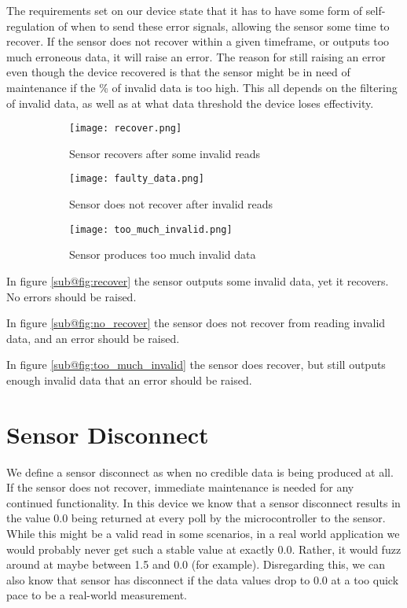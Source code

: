 The requirements set on our device state that it has to have some form of self-regulation of when to send these error signals, allowing the sensor some time to recover. If the sensor does not recover within a given timeframe, or outputs too much erroneous data, it will raise an error. The reason for still raising an error even though the device recovered is that the sensor might be in need of maintenance if the \% of invalid data is too high. This all depends on the filtering of invalid data, as well as at what data threshold the device loses effectivity.

\begin{figure}[H]
\centering
	\begin{subfigure}[b]{0.3\textwidth}
    \texttt{[image: recover.png]}
    \caption{Sensor recovers after some invalid reads}
    \label{fig:recover}
	\end{subfigure}
	\begin{subfigure}[b]{0.3\textwidth}
    \texttt{[image: faulty\_data.png]}
    \caption{Sensor does not recover after invalid reads}
    \label{fig:no_recover}
	\end{subfigure}
	\begin{subfigure}[b]{0.3\textwidth}
    \texttt{[image: too\_much\_invalid.png]}
    \caption{Sensor produces too much invalid data}
    \label{fig:too_much_invalid}
	\end{subfigure}
\caption{}
\end{figure}
In figure \ref{sub@fig:recover} the sensor outputs some invalid data, yet it recovers. No errors should be raised.

In figure \ref{sub@fig:no_recover} the sensor does not recover from reading invalid data, and an error should be raised.

In figure \ref{sub@fig:too_much_invalid} the sensor does recover, but still outputs enough invalid data that an error should be raised. 


\section{Sensor Disconnect}
We define a sensor disconnect as when no credible data is being produced at all. If the sensor does not recover, immediate maintenance is needed for any continued functionality. In this device we know that a sensor disconnect results in the value 0.0 being returned at every poll by the microcontroller to the sensor. While this might be a valid read in some scenarios, in a real world application we would probably never get such a stable value at exactly 0.0. Rather, it would fuzz around at maybe between 1.5 and 0.0 (for example). Disregarding this, we can also know that sensor has disconnect if the data values drop to 0.0 at a too quick pace to be a real-world measurement. 

